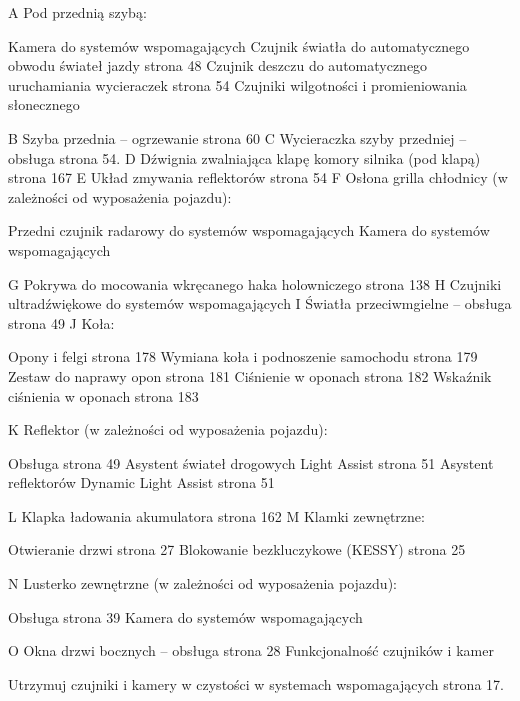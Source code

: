 A Pod przednią szybą:
\begin{itemizeTriangle}
	\itemTriangle Kamera do systemów wspomagających
	\itemTriangle Czujnik światła do automatycznego obwodu świateł jazdy \guillemotright strona 48
	\itemTriangle Czujnik deszczu do automatycznego uruchamiania wycieraczek \guillemotright strona 54
	\itemTriangle Czujniki wilgotności i promieniowania słonecznego
\end{itemizeTriangle}
B Szyba przednia – ogrzewanie \guillemotright strona 60
C Wycieraczka szyby przedniej – obsługa \guillemotright strona 54.
D Dźwignia zwalniająca klapę komory silnika (pod klapą) \guillemotright strona 167
E Układ zmywania reflektorów \guillemotright strona 54
F Osłona grilla chłodnicy (w zależności od wyposażenia pojazdu):
\begin{itemizeTriangle}
	\itemTriangle Przedni czujnik radarowy do systemów wspomagających
	\itemTriangle Kamera do systemów wspomagających
\end{itemizeTriangle}
G Pokrywa do mocowania wkręcanego haka holowniczego \guillemotright strona 138
H Czujniki ultradźwiękowe do systemów wspomagających
I Światła przeciwmgielne – obsługa \guillemotright strona 49
J Koła:
\begin{itemizeTriangle}
	\itemTriangle Opony i felgi \guillemotright strona 178
	\itemTriangle Wymiana koła i podnoszenie samochodu \guillemotright strona 179
	\itemTriangle Zestaw do naprawy opon \guillemotright strona 181
	\itemTriangle Ciśnienie w oponach \guillemotright strona 182
	\itemTriangle Wskaźnik ciśnienia w oponach \guillemotright strona 183
\end{itemizeTriangle}
K Reflektor (w zależności od wyposażenia pojazdu):
\begin{itemizeTriangle}
	\itemTriangle Obsługa \guillemotright strona 49
	\itemTriangle Asystent świateł drogowych Light Assist \guillemotright strona 51
	\itemTriangle Asystent reflektorów Dynamic Light Assist \guillemotright strona 51
\end{itemizeTriangle}
L Klapka ładowania akumulatora \guillemotright strona 162
M Klamki zewnętrzne:
\begin{itemizeTriangle}
	\itemTriangle Otwieranie drzwi \guillemotright strona 27
	\itemTriangle Blokowanie bezkluczykowe (KESSY) \guillemotright strona 25
\end{itemizeTriangle}
N Lusterko zewnętrzne (w zależności od wyposażenia pojazdu):
\begin{itemizeTriangle}
	\itemTriangle Obsługa \guillemotright strona 39
	\itemTriangle Kamera do systemów wspomagających
\end{itemizeTriangle}
O Okna drzwi bocznych – obsługa \guillemotright strona 28
Funkcjonalność czujników i kamer
\begin{itemizeArrow}
	\itemArrow Utrzymuj czujniki i kamery w czystości w systemach wspomagających \guillemotright strona 17.
\end{itemizeArrow}


